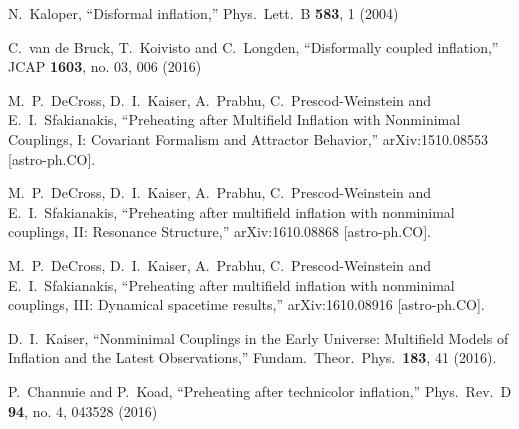 \documentclass[aps,prd,amsmath,amssymb,preprintnumbers,onecolumn,11pt,nofootinbib]{revtex4}
\begin{document}
\begin{thebibliography}{50}
  N.~Kaloper, ``Disformal inflation,''
  Phys.\ Lett.\ B {\bf 583}, 1 (2004)
 
  C.~van de Bruck, T.~Koivisto and C.~Longden, ``Disformally coupled inflation,''
  JCAP {\bf 1603}, no. 03, 006 (2016)
 
  M.~P.~DeCross, D.~I.~Kaiser, A.~Prabhu, C.~Prescod-Weinstein and E.~I.~Sfakianakis, ``Preheating after Multifield Inflation with Nonminimal Couplings, I: Covariant Formalism and Attractor Behavior,''
  arXiv:1510.08553 [astro-ph.CO].
  
  M.~P.~DeCross, D.~I.~Kaiser, A.~Prabhu, C.~Prescod-Weinstein and E.~I.~Sfakianakis, ``Preheating after multifield inflation with nonminimal couplings, II: Resonance Structure,''
  arXiv:1610.08868 [astro-ph.CO].

  M.~P.~DeCross, D.~I.~Kaiser, A.~Prabhu, C.~Prescod-Weinstein and E.~I.~Sfakianakis, ``Preheating after multifield inflation with nonminimal couplings, III: Dynamical spacetime results,'' arXiv:1610.08916 [astro-ph.CO].
  
  D.~I.~Kaiser, ``Nonminimal Couplings in the Early Universe: Multifield Models of Inflation and the Latest Observations,'' Fundam.\ Theor.\ Phys.\  {\bf 183}, 41 (2016).
  
  P.~Channuie and P.~Koad, ``Preheating after technicolor inflation,''
  Phys.\ Rev.\ D {\bf 94}, no. 4, 043528 (2016)
   

\end{thebibliography}
\end{document}
